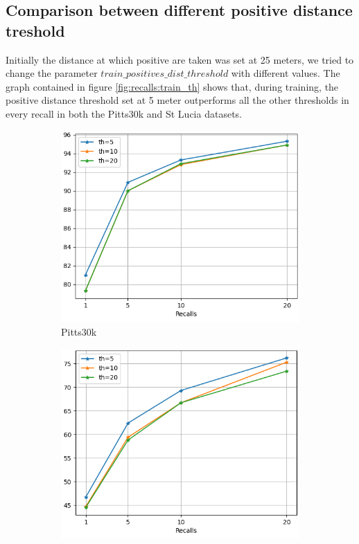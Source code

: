 \documentclass[10pt,twocolumn,letterpaper]{article}
\begin{document}
\subsection{Comparison between different positive distance treshold}
Initially the distance at which positive are taken was set at 25 meters, we tried to change the parameter ${train\_positives\_dist\_threshold}$ with different values. The graph contained in figure \ref{fig:recalls:train_th} shows that, during training, the positive distance threshold set at 5 meter outperforms all the other thresholds in every recall in both the Pitts30k and St Lucia datasets.\\
\begin{figure}
	\centering
	\begin{subfigure}[b]{0.23\textwidth}
		\centering
		\includegraphics[width=\textwidth]{img/train_th/test_pitts30k_recalls_graph.png}
		\caption{Pitts30k}
		\label{fig:recalls:train_th:pitts30k}
	\end{subfigure}
	\hfill
	\begin{subfigure}[b]{0.23\textwidth}
		\centering
		\includegraphics[width=\textwidth]{img/train_th/test_st_lucia_recalls_graph.png}

\end{subfigure}
\end{figure}
\end{document}
